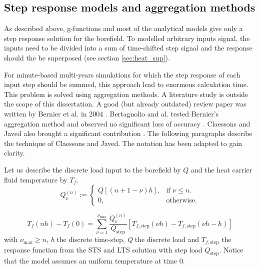 \documentclass[a4paper,oneside,11pt]{report}
\begin{document}
{\subsection{Step response models and aggregation methods} \label{ssec:bf_step}

As described above, g-functions and most of the analytical models give only a step response solution for the borefield. To modelled arbitrary inputs signal, the inputs need to be divided into a sum of time-shifted step signal and the response should the be superposed (see section \ref{sec:heat_sup}).

For minute-based multi-years simulations for which the step response of each input step should be summed, this approach lead to enormous calculation time. This problem is solved using aggregation methods. A literature study is outside the scope of this dissertation. A good (but already outdated) review paper was written by Bernier et al. in 2004 \cite{ber04}. Bertagnolio and al. tested Bernier's aggregation method and observed no significant loss of accuracy \cite{bert12}. Claessons and Javed also brought a significant contribution \cite{jav12}. The following paragraphs describe the technique of Claessons and Javed. The notation has been adapted to gain clarity.

Let us describe the discrete load input to the borefield by $Q$ and the heat carrier fluid temperature by $T_f$.
\begin{equation} \label{eq:bf_disLoa}
  Q_{\nu}^{(n)} := \begin{cases}
    Q\left[ (n+1-\nu) h \right], & \text{if $\nu \leq n$}.\\
    0, & \text{otherwise}.
  \end{cases}
\end{equation}

\begin{equation} \label{eq:bf_supTste}
  T_f(n h) - T_f(0) = \sum_{\nu=1}^{\nu_{\text{max}} }\frac{Q_{\nu}^{(n)}}{Q_{\text{step}}} \left[ T_{f,\text{step}}(\nu h) - T_{f,\text{step}}(\nu h - h) \right]
\end{equation}
with $\nu_{\text{max}} \geq n$, \textit{h} the discrete time-step, \textit{Q} the discrete load and $T_{f,\text{step}}$ the response function from the STS and LTS solution with step load $Q_{\text{step}}$. Notice that the model assumes an uniform temperature at time 0.

}
\end{document}

